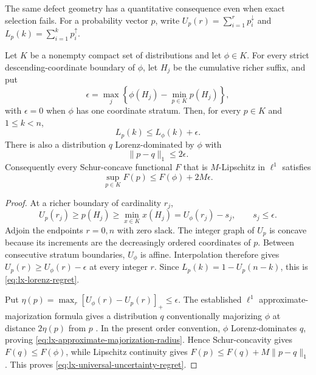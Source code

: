 The same defect geometry has a quantitative consequence even when exact
selection fails.  For a probability vector $p$, write
$U_p(r)=\sum_{i=1}^r p_i^\downarrow$ and
$L_p(k)=\sum_{i=1}^k p_i^\uparrow$.

\begin{theorem}
\label{thm:lx-credal-defect-stability}
Let $K$ be a nonempty compact set of distributions and let $\phi\in K$.
For every strict descending-coordinate boundary of $\phi$, let $H_j$ be the
cumulative richer suffix, and put
\[
 \epsilon=\max_j\left\{\phi(H_j)-\min_{p\in K}p(H_j)\right\},             \tag{US}
 \label{eq:lx-uncertainty-slack-radius}
\]
with $\epsilon=0$ when $\phi$ has one coordinate stratum.  Then, for every
$p\in K$ and $1\leq k<n$,
\[
 L_p(k)\leq L_\phi(k)+\epsilon.                         \tag{LR}
 \label{eq:lx-lorenz-regret}
\]
There is also a distribution $q$ Lorenz-dominated by $\phi$ with
\[
 \lVert p-q\rVert_1\leq2\epsilon.                       \tag{AM}
 \label{eq:lx-approximate-majorization-radius}
\]
Consequently every Schur-concave functional $F$ that is $M$-Lipschitz in
$\ell^1$ satisfies
\[
 \sup_{p\in K}F(p)\leq F(\phi)+2M\epsilon.               \tag{UR}
 \label{eq:lx-universal-uncertainty-regret}
\]
\end{theorem}

\begin{proof}
At a richer boundary of cardinality $r_j$,
\[
 U_p(r_j)\geq p(H_j)
 \geq\min_{x\in K}x(H_j)=U_\phi(r_j)-s_j,
 \qquad s_j\leq\epsilon.
\]
Adjoin the endpoints $r=0,n$ with zero slack.
The integer graph of $U_p$ is concave because its increments are the
decreasingly ordered coordinates of $p$.  Between consecutive stratum
boundaries, $U_\phi$ is affine.  Interpolation therefore gives
$U_p(r)\geq U_\phi(r)-\epsilon$ at every integer $r$.  Since
$L_p(k)=1-U_p(n-k)$, this is \eqref{eq:lx-lorenz-regret}.

Put $\eta(p)=\max_r[U_\phi(r)-U_p(r)]_+\leq\epsilon$.
The established $\ell^1$ approximate-majorization formula gives a
distribution $q$ conventionally majorizing $\phi$ at distance
$2\eta(p)$ from $p$ \citep{HorodeckiOppenheimSparaciari2018}.  In the present
order convention, $\phi$ Lorenz-dominates $q$, proving
\eqref{eq:lx-approximate-majorization-radius}.  Hence Schur-concavity gives
$F(q)\leq F(\phi)$, while Lipschitz continuity gives
$F(p)\leq F(q)+M\lVert p-q\rVert_1$.  This proves
\eqref{eq:lx-universal-uncertainty-regret}.
\end{proof}

